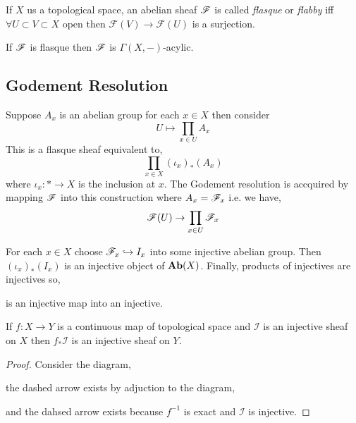 \documentclass[12pt]{article}
\begin{document}
\begin{definition}
If $X$ us a topological space, an abelian sheaf $\mathscr{F}$ is called \textit{flasque} or \textit{flabby} iff $\forall U \subset V \subset X$ open then  $\mathcal{F}(V) \to \mathcal{F}(U)$ is a surjection. 
\end{definition}

\begin{lemma}
If $\mathscr{F}$ is flasque then $\mathscr{F}$ is $\Gamma(X, - )$-acylic. 
\end{lemma}

\subsection{Godement Resolution}

Suppose $A_x$ is an abelian group for each $x \in X$ then consider
\[ U \mapsto \prod_{x \in U} A_x \]
This is a flasque sheaf equivalent to,
\[ \prod_{x \in X} (\iota_x)_*(A_x) \]
where $\iota_x : * \to X$ is the inclusion at $x$. The Godement resolution is accquired by mapping $\mathscr{F}$ into this construction where $A_x = \mathscr{F}_x$ i.e. we have,\[ \mathscr{F}(U) \to \prod_{x \in U} \mathscr{F}_x \]

\begin{theorem}
For each $x \in X$ choose $\mathscr{F}_x \hookrightarrow I_x$ into some injective abelian group. Then $(\iota_x)_*(I_x)$ is an injective object of $\mathbf{Ab}(X)$. Finally, products of injectives are injectives so,
\begin{center}
\end{center}
is an injective map into an injective. 
\end{theorem}

\begin{proposition}
If $f : X \to Y$ is a continuous map of topological space and $\mathcal{I}$ is an injective sheaf on $X$ then $f_* \mathcal{I}$ is an injective sheaf on $Y$.
\end{proposition}

\begin{proof}
Consider the diagram,
\begin{center}
\end{center}
the dashed arrow exists by adjuction to the diagram,
\begin{center}
\end{center}
and the dahsed arrow exists because $f^{-1}$ is exact and $\mathcal{I}$ is injective. 
\end{proof}
\end{document}
